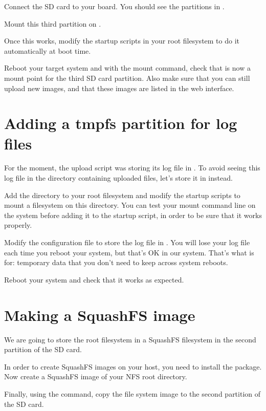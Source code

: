 Connect the SD card to your board. You should see the partitions
in .

Mount this third partition on .

Once this works, modify the startup scripts in your root filesystem
to do it automatically at boot time.

Reboot your target system and with the mount command, check that
 is now a mount point for the third SD card
partition. Also make sure that you can still upload new images, and
that these images are listed in the web interface.

\section{Adding a tmpfs partition for log files}

For the moment, the upload script was storing its log file in
. To avoid seeing this log file in
the directory containing uploaded files, let's store it in
 instead.

Add the  directory to your root filesystem and modify
the startup scripts to mount a  filesystem on this
directory. You can test your  mount command line on the
system before adding it to the startup script, in order to be sure
that it works properly.

Modify the  configuration file to store
the log file in . You will lose your log
file each time you reboot your system, but that's OK in our
system. That's what  is for: temporary data that you don't need
to keep across system reboots.

Reboot your system and check that it works as expected.

\section{Making a SquashFS image}

We are going to store the root filesystem in a SquashFS filesystem in
the second partition of the SD card.

In order to create SquashFS images on your host, you need to install
the  package. Now create a SquashFS image of your
NFS root directory.

Finally, using the  command, copy the file system image to
the second partition of the SD card.

